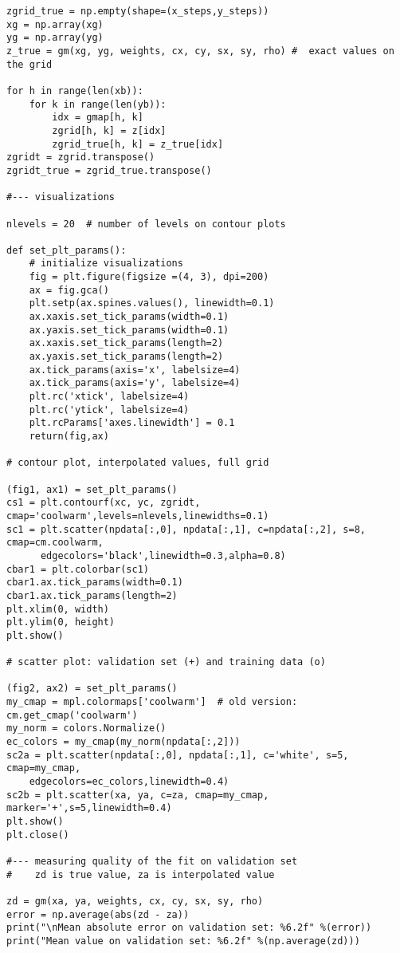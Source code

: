 \documentclass[oneside,10pt]{book}
\begin{document}
\begin{lstlisting}
zgrid_true = np.empty(shape=(x_steps,y_steps))
xg = np.array(xg)
yg = np.array(yg)
z_true = gm(xg, yg, weights, cx, cy, sx, sy, rho) #  exact values on the grid

for h in range(len(xb)):
    for k in range(len(yb)):
        idx = gmap[h, k]
        zgrid[h, k] = z[idx]  
        zgrid_true[h, k] = z_true[idx]
zgridt = zgrid.transpose() 
zgridt_true = zgrid_true.transpose() 

#--- visualizations

nlevels = 20  # number of levels on contour plots

def set_plt_params():
    # initialize visualizations
    fig = plt.figure(figsize =(4, 3), dpi=200) 
    ax = fig.gca()
    plt.setp(ax.spines.values(), linewidth=0.1)
    ax.xaxis.set_tick_params(width=0.1)
    ax.yaxis.set_tick_params(width=0.1)
    ax.xaxis.set_tick_params(length=2)
    ax.yaxis.set_tick_params(length=2)
    ax.tick_params(axis='x', labelsize=4)
    ax.tick_params(axis='y', labelsize=4)
    plt.rc('xtick', labelsize=4) 
    plt.rc('ytick', labelsize=4) 
    plt.rcParams['axes.linewidth'] = 0.1
    return(fig,ax)

# contour plot, interpolated values, full grid

(fig1, ax1) = set_plt_params() 
cs1 = plt.contourf(xc, yc, zgridt, cmap='coolwarm',levels=nlevels,linewidths=0.1)  
sc1 = plt.scatter(npdata[:,0], npdata[:,1], c=npdata[:,2], s=8, cmap=cm.coolwarm,
      edgecolors='black',linewidth=0.3,alpha=0.8)
cbar1 = plt.colorbar(sc1)
cbar1.ax.tick_params(width=0.1) 
cbar1.ax.tick_params(length=2) 
plt.xlim(0, width)
plt.ylim(0, height)
plt.show()
           
# scatter plot: validation set (+) and training data (o)         

(fig2, ax2) = set_plt_params()
my_cmap = mpl.colormaps['coolwarm']  # old version: cm.get_cmap('coolwarm')
my_norm = colors.Normalize()
ec_colors = my_cmap(my_norm(npdata[:,2]))
sc2a = plt.scatter(npdata[:,0], npdata[:,1], c='white', s=5, cmap=my_cmap, 
    edgecolors=ec_colors,linewidth=0.4)
sc2b = plt.scatter(xa, ya, c=za, cmap=my_cmap, marker='+',s=5,linewidth=0.4)
plt.show()
plt.close()

#--- measuring quality of the fit on validation set
#    zd is true value, za is interpolated value

zd = gm(xa, ya, weights, cx, cy, sx, sy, rho) 
error = np.average(abs(zd - za)) 
print("\nMean absolute error on validation set: %6.2f" %(error))
print("Mean value on validation set: %6.2f" %(np.average(zd)))


\end{lstlisting}
\end{document}
